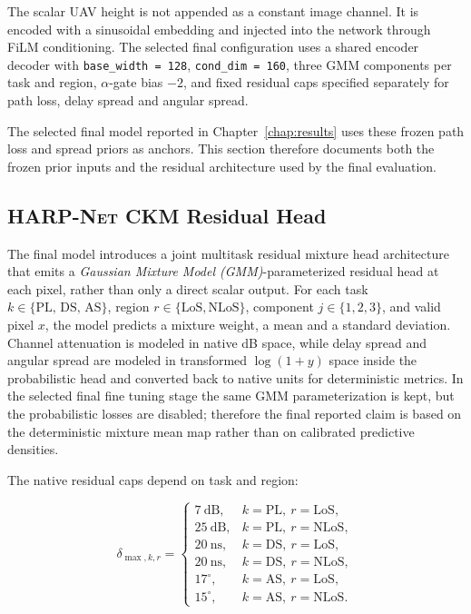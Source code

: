 The scalar UAV height is not appended as a constant image channel. It is
encoded with a sinusoidal embedding and injected into the network through FiLM
conditioning. The selected final configuration uses a shared encoder decoder with
\texttt{base\_width = 128}, \texttt{cond\_dim = 160}, three GMM
components per task and region, \(\alpha\)-gate bias \(-2\), and fixed
residual caps specified separately for path loss, delay spread and
angular spread.

The selected final model reported in Chapter~\ref{chap:results}
uses these frozen path loss and spread priors as anchors. This
section therefore documents both the frozen prior inputs and the residual
architecture used by the final evaluation.

\subsection[HARP-Net CKM Residual Head]{\textsc{HARP-Net CKM} Residual Head}

The final model introduces a joint multitask residual mixture head architecture that
emits a \emph{Gaussian Mixture Model (GMM)}-parameterized residual head at each
pixel, rather than only a direct scalar output. For each task \(k \in \{\mathrm{PL},\, \mathrm{DS},\, \mathrm{AS}\}\),
region \(r\in\{\mathrm{LoS},\mathrm{NLoS}\}\), component
\(j\in\{1,2,3\}\), and valid pixel \(x\), the model predicts a mixture
weight, a mean and a standard deviation. Channel attenuation is modeled in native dB
space, while delay spread and angular spread are modeled in transformed
\(\log(1+y)\) space inside the probabilistic head and converted back to
native units for deterministic metrics.
In the selected final fine tuning stage the same GMM parameterization is kept,
but the probabilistic losses are disabled; therefore the final reported claim
is based on the deterministic mixture mean map rather than on calibrated
predictive densities.

The native residual caps depend on task and region:

\begin{equation}
\delta_{\max,k,r}
=
\begin{cases}
7~\mathrm{dB}, & k=\mathrm{PL},\ r=\mathrm{LoS},\\
25~\mathrm{dB}, & k=\mathrm{PL},\ r=\mathrm{NLoS},\\
20~\mathrm{ns}, & k=\mathrm{DS},\ r=\mathrm{LoS},\\
20~\mathrm{ns}, & k=\mathrm{DS},\ r=\mathrm{NLoS},\\
17^\circ, & k=\mathrm{AS},\ r=\mathrm{LoS},\\
15^\circ, & k=\mathrm{AS},\ r=\mathrm{NLoS}.
\end{cases}
\label{eq:try80_residual_caps}
\end{equation}

